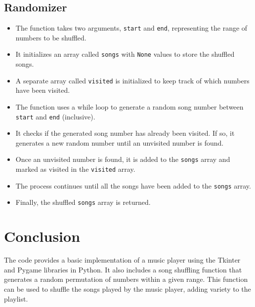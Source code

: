 \documentclass[journal,12pt,twocolumn]{IEEEtran}
\begin{document}
\subsection{Randomizer}
\begin{itemize}
  \item The function takes two arguments, \texttt{start} and \texttt{end}, representing the range of numbers to be shuffled.
  \item It initializes an array called \texttt{songs} with \texttt{None} values to store the shuffled songs.
  \item A separate array called \texttt{visited} is initialized to keep track of which numbers have been visited.
  \item The function uses a while loop to generate a random song number between \texttt{start} and \texttt{end} (inclusive).
  \item It checks if the generated song number has already been visited. If so, it generates a new random number until an unvisited number is found.
  \item Once an unvisited number is found, it is added to the \texttt{songs} array and marked as visited in the \texttt{visited} array.
  \item The process continues until all the songs have been added to the \texttt{songs} array.
  \item Finally, the shuffled \texttt{songs} array is returned.
\end{itemize}


\section{Conclusion}
The code provides a basic implementation of a music player using the Tkinter and Pygame libraries in Python. It also includes a song shuffling function that generates a random permutation of numbers within a given range. This function can be used to shuffle the songs played by the music player, adding variety to the playlist.
\end{document}
